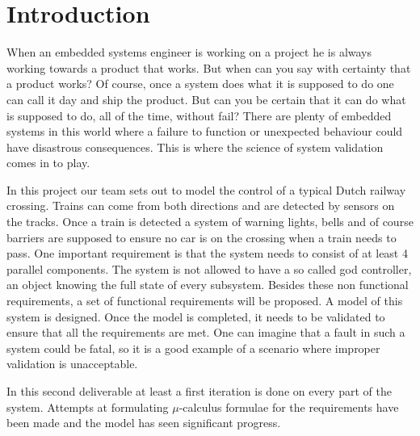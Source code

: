 \documentclass[final]{report}
\begin{document}
\chapter{Introduction}
When an embedded systems engineer is working on a project he is always working towards a product that works.
But when can you say with certainty that a product works? Of course, once a system does what it is supposed to do one can call it day and ship the product.
But can you be certain that it can do what is supposed to do, all of the time, without fail? There are plenty of embedded systems in this world where a failure to function or unexpected behaviour could have disastrous consequences.
This is where the science of system validation comes in to play.

In this project our team sets out to model the control of a typical Dutch railway crossing.
Trains can come from both directions and are detected by sensors on the tracks.
Once a train is detected a system of warning lights, bells and of course barriers are supposed to ensure no car is on the crossing when a train needs to pass.
One important requirement is that the system needs to consist of at least 4 parallel components.
The system is not allowed to have a so called god controller, an object knowing the full state of every subsystem.
Besides these non functional requirements, a set of functional requirements will be proposed. A model of this system is designed. Once the model is completed, it needs to be validated to ensure that all the requirements are met.
One can imagine that a fault in such a system could be fatal, so it is a good example of a scenario where improper validation is unacceptable.

In this second deliverable at least a first iteration is done on every part of the system.
Attempts at formulating $\mu$-calculus formulae for the requirements have been made and the model has seen significant progress.
\end{document}
